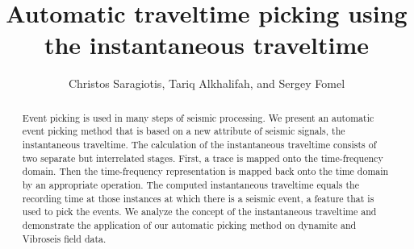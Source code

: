 


\newcommand{\imag}{\mathrm{Im}}

\renewcommand{\thefootnote}{\fnsymbol{footnote}} 
\title{Automatic traveltime picking using the instantaneous traveltime}
\author{Christos Saragiotis\footnotemark[1], Tariq Alkhalifah\footnotemark[1], 
        and Sergey Fomel\footnotemark[2]}

\address{
\footnotemark[1]Physical Sciences and Engineering Division \\
King Abdullah University of Science and Technology \\
Thuwal 23955-6900 \\
Saudi Arabia \\
\footnotemark[2]Bureau of Economic Geology, \\
John A.~and Katherine G.~Jackson School of Geosciences \\
The University of Texas at Austin \\
University Station, Box X \\
Austin, TX 78713-8972 \\
USA}


%
%




\maketitle

\begin{abstract}
Event picking is used in many steps of seismic processing. We present an automatic event picking method that is based on a new attribute of seismic signals, the instantaneous traveltime. The calculation of the instantaneous traveltime  consists of two separate but interrelated stages. First, a trace is mapped onto the time-frequency domain. Then the time-frequency representation is mapped back onto the time domain by an appropriate operation. The computed instantaneous traveltime equals the recording time at those instances at which there is a seismic event, a feature that is used to pick the events. 
We analyze the concept of the instantaneous traveltime and demonstrate the application of our automatic picking method on dynamite and Vibroseis field data.
\end{abstract}

